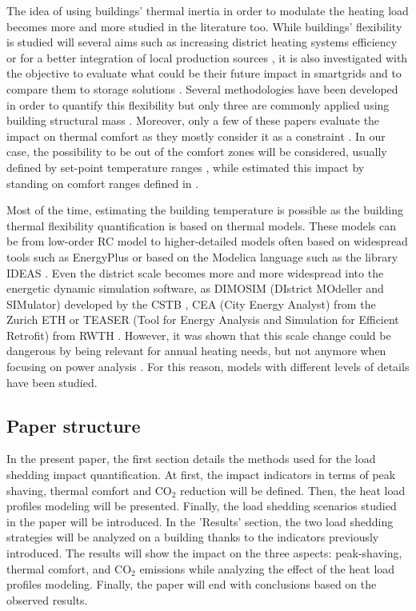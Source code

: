 \documentclass[buildings,article,submit,moreauthors,pdftex,10pt,a4paper]{mdpi}
\theoremstyle{mdpi}
\newcounter{ex}
\newcounter{re}
\theoremstyle{mdpidefinition}
\begin{document}
The idea of using buildings' thermal inertia in order to modulate the heating load becomes more and more studied in the literature too. While buildings' flexibility is studied will several aims such as increasing district heating systems efficiency \cite{kensby_potential_2015,romanchenko_thermal_2018} or for a better integration of local production sources \cite{reynders_potential_2013}, it is also investigated with the objective to evaluate what could be their future impact in smartgrids \cite{de_coninck_bottom-up_2013} and to compare them to storage solutions \cite{le_dreau_energy_2016}. Several methodologies have been developed in order to quantify this flexibility but only three are commonly applied using building structural mass \cite{reynders_energy_2018}. Moreover, only a few of these papers evaluate the impact on thermal comfort as they mostly consider it as a constraint \cite{reynders_generic_2017}. In our case, the possibility to be out of the comfort zones will be considered, usually defined by set-point temperature ranges \cite{aduda_demand_2016,le_dreau_energy_2016}, while estimated this impact by standing on comfort ranges defined in \cite{faria_neto_thermal_2016}.

Most of the time, estimating the building temperature is possible as the building thermal flexibility quantification is based on thermal models. These models can be from low-order RC model \cite{goy_estimating_2017} to higher-detailed models often based on widespread tools such as EnergyPlus \cite{le_dreau_energy_2016, hurtado_quantifying_2017} or based on the Modelica language such as the library IDEAS \cite{reynders_quality_2014}. 
Even the district scale becomes more and more widespread into the energetic dynamic simulation software, as DIMOSIM (DIstrict MOdeller and SIMulator) developed by the CSTB \cite{perez_contribution_2017}, CEA (City Energy Analyst) from the Zurich ETH \cite{fonseca_city_2016} or TEASER (Tool for Energy Analysis and Simulation for Efficient Retrofit) from RWTH \cite{remmen_teaser:_2018}.
However, it was shown that this scale change could be dangerous by being relevant for annual heating needs, but not anymore when focusing on power analysis \cite{frayssinet_adaptation_2017}. For this reason, models with different levels of details have been studied.

\subsection{Paper structure}	%
In the present paper, the first section details the methods used for the load shedding impact quantification. At first, the impact indicators in terms of peak shaving, thermal comfort and CO$_2$ reduction will be defined. Then, the heat load profiles modeling will be presented. Finally, the load shedding scenarios studied in the paper will be introduced. In the 'Results' section, the two load shedding strategies will be analyzed on a building thanks to the indicators previously introduced. The results will show the impact on the three aspects: peak-shaving, thermal comfort, and CO$_2$ emissions while analyzing the effect of the heat load profiles modeling. Finally, the paper will end with conclusions based on the observed results.
\end{document}
